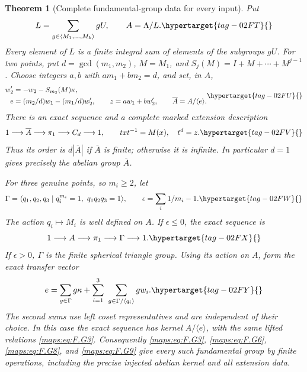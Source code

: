 \documentclass[11pt,a4paper]{article}
\numberwithin{equation}{section}
\newtheorem{theorem}{Theorem}[section]
\theoremstyle{definition}
\begin{document}
\begin{theorem}[Complete fundamental-group data for every input]
Put
\begin{equation}
 L=\sum_{g\in\langle M_1,\ldots,M_k\rangle}gU,
 \qquad A=\Lambda/L.                                      \hypertarget{tag-02FT}{}\label{maps:eq:F.G4}
\end{equation}
Every element of $L$ is a finite integral sum of elements of the subgroups $gU$.  For two points, put
$d=\gcd(m_1,m_2)$, $M=M_1$, and
$S_j(M)=I+M+\cdots+M^{j-1}$.  Choose integers $a,b$ with
$am_1+bm_2=d$, and set, in $A$,
\begin{equation}
 \begin{split}
 w'_2&=-w_2-S_{m_2}(M)\kappa,\\
 e&=(m_2/d)w_1-(m_1/d)w'_2,\qquad
 z=aw_1+bw'_2,\qquad \overline A=A/\langle e\rangle .
 \end{split}                                             \hypertarget{tag-02FU}{}\label{maps:eq:F.G5}
\end{equation}
There is an exact sequence and a complete marked extension description
\begin{equation}
 1\longrightarrow\overline A\longrightarrow\pi_1
   \longrightarrow C_d\longrightarrow1,
 \qquad txt^{-1}=M(x),\quad t^d=z.                         \hypertarget{tag-02FV}{}\label{maps:eq:F.G6}
\end{equation}
Thus its order is $d|\overline A|$ if $\overline A$ is finite;
otherwise it is infinite.  In particular $d=1$ gives precisely
the abelian group $\overline A$.

For three genuine points, so $m_i\ge2$, let
\begin{equation}
 \Gamma=\langle q_1,q_2,q_3\mid q_i^{m_i}=1,
                         \ q_1q_2q_3=1\rangle,
 \qquad \epsilon=\sum_i1/m_i-1.                           \hypertarget{tag-02FW}{}\label{maps:eq:F.G7}
\end{equation}
The action $q_i\mapsto M_i$ is well defined on $A$.
If $\epsilon\le0$, the exact sequence is
\begin{equation}
                    1\longrightarrow A\longrightarrow\pi_1
                         \longrightarrow\Gamma\longrightarrow1. 
 \hypertarget{tag-02FX}{}\label{maps:eq:F.G8}
\end{equation}
If $\epsilon>0$, $\Gamma$ is the finite spherical triangle group.
Using its action on $A$, form the exact transfer vector
\begin{equation}
 e=\sum_{g\in\Gamma}g\kappa+
       \sum_{i=1}^3\ \sum_{g\in\Gamma/\langle q_i\rangle}g w_i.
 \hypertarget{tag-02FY}{}\label{maps:eq:F.G9}
\end{equation}
The second sums use left coset representatives and are independent
of their choice.  In this case the exact sequence has kernel
$A/\langle e\rangle$, with the same lifted relations \eqref{maps:eq:F.G3}.
Consequently \eqref{maps:eq:F.G3}, \eqref{maps:eq:F.G6}, \eqref{maps:eq:F.G8}, and \eqref{maps:eq:F.G9} give every such fundamental group by finite operations, including the precise
injected abelian kernel and all extension data.


\end{theorem}
\end{document}
